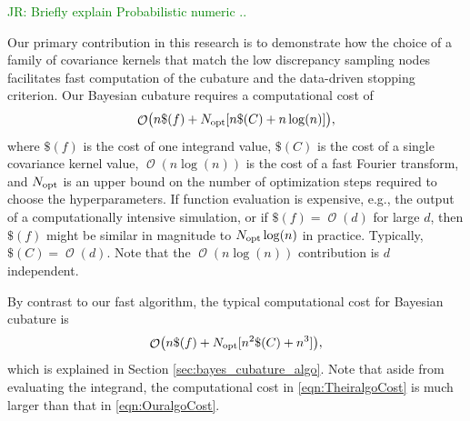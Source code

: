 \documentclass{iitthesis}          %
\DeclareMathOperator{\Order}{{\mathcal O}}
\newcommand{\opt}{\textup{opt}}
\newcommand{\JRNote}[1]{{\textcolor{green}{JR: #1}}}
\begin{document}
\JRNote{Briefly explain Probabilistic numeric ..}



Our primary contribution in this research is to demonstrate how the choice of a family of covariance kernels that match the low discrepancy sampling nodes facilitates fast computation of the cubature and the data-driven stopping criterion.  Our Bayesian cubature requires a computational cost of
\begin{equation} \label{eqn:OuralgoCost}
\Order\bigl(n \$(f) + N_{\opt}[n\$(C) + 
n \log(n)] \bigr),
\end{equation} 
where $\$(f)$ is the cost of one integrand value, $\$(C)$ is the cost of a single covariance kernel value,  $\Order(n \log(n))$ is the cost of a fast Fourier transform, and $N_{\opt}$ is an upper bound on the number of optimization steps required to choose the hyperparameters. If function evaluation is expensive, e.g., the output of a computationally intensive simulation, or if $\$(f) = \Order(d)$ for large $d$, then $\$(f)$ might be similar in magnitude to $N_{\opt} \log(n)$ in practice.  Typically, $\$(C) = \Order(d)$.  Note that the $\Order(n \log(n))$ contribution is $d$ independent.


By contrast to our fast algorithm, the typical computational cost for Bayesian cubature is
\begin{equation} \label{eqn:TheiralgoCost}
\Order\bigl(n \$(f) + N_{\opt}[n^2\$(C) + n^3] \bigr),
\end{equation} 
which is explained in Section \ref{sec:bayes_cubature_algo}. Note that aside from evaluating the integrand, the computational cost in \eqref{eqn:TheiralgoCost} is much larger than that in \eqref{eqn:OuralgoCost}.  



\end{document}
